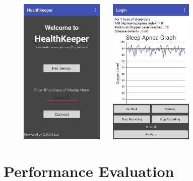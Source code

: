 \documentclass[10pt,journal,compsoc]{IEEEtran}
\begin{document}
\begin{figure}[h]
\centering
\includegraphics[width=4cm]{welcome}  \ \ \    
\includegraphics[width=4cm]{session}
\end{figure}

\section{Performance Evaluation}
\end{document}
